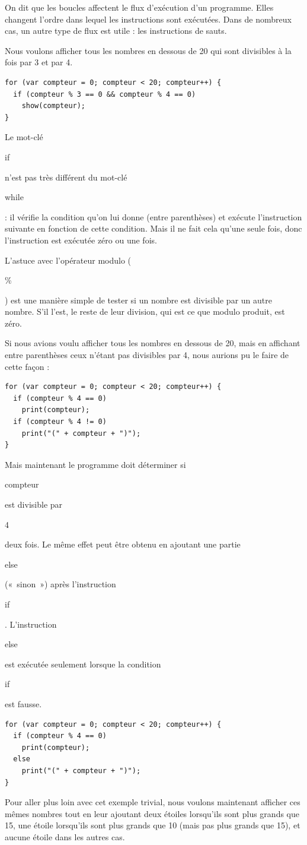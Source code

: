 \documentclass{FramateX}
\renewcommand{\texttt}[1]{\begin{sffamily}{#1}\end{sffamily}}
\begin{document}
\begin{center}\end{center}

On dit que les boucles affectent le flux d'exécution d'un programme.
Elles changent l'ordre dans lequel les instructions sont exécutées. Dans
de nombreux cas, un autre type de flux est utile : les instructions de
sauts.

Nous voulons afficher tous les nombres en dessous de 20 qui sont
divisibles à la fois par 3 et par 4.

\begin{lstlisting}
for (var compteur = 0; compteur < 20; compteur++) {
  if (compteur % 3 == 0 && compteur % 4 == 0)
    show(compteur);
}
\end{lstlisting}
Le mot-clé \texttt{if} n'est pas très différent du mot-clé
\texttt{while} : il vérifie la condition qu'on lui donne (entre
parenthèses) et exécute l'instruction suivante en fonction de cette
condition. Mais il ne fait cela qu'une seule fois, donc l'instruction
est exécutée zéro ou une fois.

L'astuce avec l'opérateur modulo (\texttt{\%}) est une manière simple de
tester si un nombre est divisible par un autre nombre. S'il l'est, le
reste de leur division, qui est ce que modulo produit, est zéro.

Si nous avions voulu afficher tous les nombres en dessous de 20, mais en
affichant entre parenthèses ceux n'étant pas divisibles par 4, nous
aurions pu le faire de cette façon :

\begin{lstlisting}
for (var compteur = 0; compteur < 20; compteur++) {
  if (compteur % 4 == 0)
    print(compteur);
  if (compteur % 4 != 0)
    print("(" + compteur + ")");
}
\end{lstlisting}
Mais maintenant le programme doit déterminer si \texttt{compteur} est
divisible par \texttt{4} deux fois. Le même effet peut être obtenu en
ajoutant une partie \texttt{else} («~sinon~») après l'instruction
\texttt{if}. L'instruction \texttt{else} est exécutée seulement lorsque
la condition \texttt{if} est fausse.

\begin{lstlisting}
for (var compteur = 0; compteur < 20; compteur++) {
  if (compteur % 4 == 0)
    print(compteur);
  else
    print("(" + compteur + ")");
}
\end{lstlisting}
Pour aller plus loin avec cet exemple trivial, nous voulons maintenant
afficher ces mêmes nombres tout en leur ajoutant deux étoiles lorsqu'ils
sont plus grands que 15, une étoile lorsqu'ils sont plus grands que 10
(mais pas plus grands que 15), et aucune étoile dans les autres cas.
\end{document}
